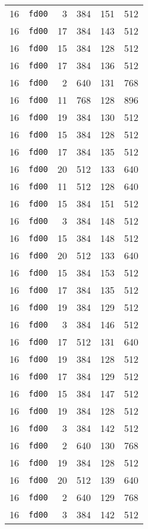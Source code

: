 \documentclass{article}
\begin{document}
\begin{table}[h!]
\begin{tabular}{llrrrl}
    16 & \texttt{fd00} & 3 & 384 & 151 & 512 \\
    16 & \texttt{fd00} & 17 & 384 & 143 & 512 \\
    16 & \texttt{fd00} & 15 & 384 & 128 & 512 \\
    16 & \texttt{fd00} & 17 & 384 & 136 & 512 \\
    16 & \texttt{fd00} & 2 & 640 & 131 & 768 \\
    16 & \texttt{fd00} & 11 & 768 & 128 & 896 \\
    16 & \texttt{fd00} & 19 & 384 & 130 & 512 \\
    16 & \texttt{fd00} & 15 & 384 & 128 & 512 \\
    16 & \texttt{fd00} & 17 & 384 & 135 & 512 \\
    16 & \texttt{fd00} & 20 & 512 & 133 & 640 \\
    16 & \texttt{fd00} & 11 & 512 & 128 & 640 \\
    16 & \texttt{fd00} & 15 & 384 & 151 & 512 \\
    16 & \texttt{fd00} & 3 & 384 & 148 & 512 \\
    16 & \texttt{fd00} & 15 & 384 & 148 & 512 \\
    16 & \texttt{fd00} & 20 & 512 & 133 & 640 \\
    16 & \texttt{fd00} & 15 & 384 & 153 & 512 \\
    16 & \texttt{fd00} & 17 & 384 & 135 & 512 \\
    16 & \texttt{fd00} & 19 & 384 & 129 & 512 \\
    16 & \texttt{fd00} & 3 & 384 & 146 & 512 \\
    16 & \texttt{fd00} & 17 & 512 & 131 & 640 \\
    16 & \texttt{fd00} & 19 & 384 & 128 & 512 \\
    16 & \texttt{fd00} & 17 & 384 & 129 & 512 \\
    16 & \texttt{fd00} & 15 & 384 & 147 & 512 \\
    16 & \texttt{fd00} & 19 & 384 & 128 & 512 \\
    16 & \texttt{fd00} & 3 & 384 & 142 & 512 \\
    16 & \texttt{fd00} & 2 & 640 & 130 & 768 \\
    16 & \texttt{fd00} & 19 & 384 & 128 & 512 \\
    16 & \texttt{fd00} & 20 & 512 & 139 & 640 \\
    16 & \texttt{fd00} & 2 & 640 & 129 & 768 \\
    16 & \texttt{fd00} & 3 & 384 & 142 & 512 \\

\end{tabular}
\end{table}
\end{document}
